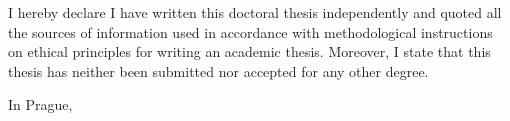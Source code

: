 \begin{declaration}
I hereby declare I have written this doctoral thesis independently and quoted all the sources of information used in accordance with methodological instructions on ethical principles for writing an academic thesis. Moreover, I state that this thesis has neither been submitted nor accepted for any other degree.

In Prague, ~~
\end{declaration}

\begin{abstract-english}
\end{abstract-english}

\begin{abstract-czech}
\end{abstract-czech}


\usepackage{todonotes}
\setlength{\marginparwidth}{4.5cm}

\usepackage[numbers]{natbib}

\usepackage{doi}

\usepackage{array}
\usepackage{booktabs}
\usepackage{cleveref}
\usepackage{csquotes}
\usepackage{datetime}
\usepackage{etoolbox}
\usepackage[detect-weight=true,binary-units=true]{siunitx}
\usepackage{tabularx}


\hypersetup{hidelinks}
